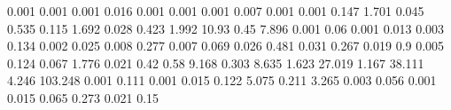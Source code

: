 0.001      0.001      %
0.001      0.016      %
0.001      0.001      %
0.001      0.007      %
0.001      0.001      %
0.147      1.701      %
0.045      0.535      %
0.115      1.692      %
0.028      0.423      %
1.992      10.93      %
0.45       7.896      %
0.001      0.06       %
0.001      0.013      %
0.003      0.134      %
0.002      0.025      %
0.008      0.277      %
0.007      0.069      %
0.026      0.481      %
0.031      0.267      %
0.019      0.9        %
0.005      0.124      %
0.067      1.776      %
0.021      0.42       %
0.58       9.168      %
0.303      8.635      %
1.623      27.019     %
1.167      38.111     %
4.246      103.248    %
0.001      0.111      %
0.001      0.015      %
0.122      5.075      %
0.211      3.265      %
0.003      0.056      %
0.001      0.015      %
0.065      0.273      %
0.021      0.15       %
